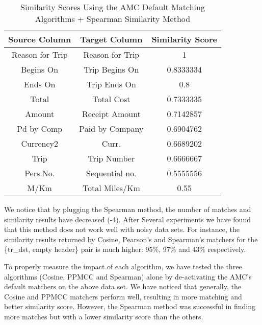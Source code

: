 \begin{table}[ht]
\centering
\begin{tabular}{|c|c|c|}
\hline
{\bf Source Column} & {\bf Target Column} & {\bf Similarity Score} \\ \hline
Reason for Trip                & Reason for Trip                & 1                                 \\ \hline
Begins On                      & Trip Begins On                 & 0.8333334                         \\ \hline
Ends On                        & Trip Ends On                   & 0.8                               \\ \hline
Total                          & Total Cost                     & 0.7333335                         \\ \hline
Amount                         & Receipt Amount                 & 0.7142857                         \\ \hline
Pd by Comp                     & Paid by Company                & 0.6904762                         \\ \hline
Currency2                      & Curr.                          & 0.6689202                         \\ \hline
Trip                           & Trip Number                    & 0.6666667                         \\ \hline
Pers.No.                       & Sequential no.                 & 0.5555556                         \\ \hline
M/Km                           & Total Miles/Km                 & 0.55                              \\ \hline
\end{tabular}
\caption{ Similarity Scores Using the AMC Default Matching Algorithms + Spearman Similarity Method}
\label{tab:Similarity_Scores_Using_the_AMC_Default_Matching_Algorithms_+_Spearman_Similarity_Method}
\end{table}

We notice that by plugging the Spearman method, the number of matches and similarity results have decreased (-4). After Several experiments we have found that this method does not work well with noisy data sets. For instance, the similarity results returned by Cosine, Pearson's and Spearman's matchers for the \{tr\_dst, empty header\} pair is much higher: 95\%, 97\% and 43\% respectively.

To properly measure the impact of each algorithm, we have tested the three algorithms (Cosine, PPMCC and Spearman) alone by de-activating the AMC's default matchers on the above data set. We have noticed that generally, the Cosine and PPMCC matchers perform well, resulting in more matching and better similarity score. However, the Spearman method was successful in finding more matches but with a lower similarity score than the others.

